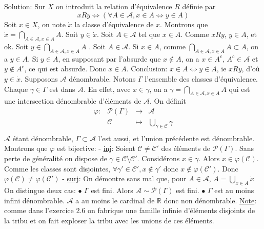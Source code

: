 \documentclass{report}
\begin{document}
Solution: Sur $X$ on introduit la relation d'équivalence $R$ définie par  $$xRy\iff \left(\forall A\in \mathcal A, x\in A \iff y\in A\right)$$ Soit $x\in X$, on note $\dot x$ la classe d'équivalence de $x$. Montrons que $\displaystyle \dot x = \bigcap_{A\in \mathcal A, x\in A}A$.\newline
\fbox{$\subset$}  Soit $y\in \dot x$. Soit $A\in \mathcal A$ tel que $x\in A$. Comme $xRy$, $y\in A$, et ok.\newline
\fbox{$\supset$} Soit $y\in \bigcap_{A\in \mathcal A, x\in A}A$ . Soit $A\in \mathcal A$. Si $x\in A$, comme $\bigcap_{A\in \mathcal A, x\in A}A \subset A$, \newline on a $y\in A$. Si $y\in A$, en supposant par l'absurde que $x\notin A$, on a $x\in A^c$, $A^c \in \mathcal A$ et  $y\notin A^c$, ce qui est absurde. Donc $x\in A$. Conclusion: $x\in A \iff y\in A$, ie $xRy$, d'où $y\in \dot x$.\newline \newline
Supposons $\mathcal A$ dénombrable.\newline
Notons $\Gamma$ l'ensemble des classes d'équivalence. Chaque $\gamma \in \Gamma$ est dans $\mathcal A$. En effet, avec $x\in \gamma$, on a $\gamma = \bigcap_{A\in \mathcal A, x\in A} A$ qui est une intersection dénombrable d'éléments de $\mathcal A$.\newline
On définit
$$\begin{array}{clcl}
  \varphi : &\mathcal{P}(\Gamma) &\longrightarrow  &\mathcal A\\
      &\mathcal C        &\longmapsto      & \bigcup_{\gamma \in \mathcal C} \gamma \\
\end{array}$$
$\mathcal A$ étant dénombrable, $\Gamma\subset \mathcal A$ l'est aussi, et l'union précédente est dénombrable.
Montrons que $\varphi$ est bijective: \newline
- \underline {inj}: Soient $\mathcal C \neq \mathcal C'$ des éléments de $\mathcal P(\Gamma)$. Sans perte de généralité on dispose de $\gamma \in \mathcal C \setminus \mathcal C'$. Considérons $x\in \gamma$. Alors $x\in \varphi(\mathcal C)$. Comme les classes sont disjointes, $\forall \gamma' \in \mathcal C', x\notin \gamma'$ donc $x\notin \varphi(\mathcal C')$. Donc $\varphi(\mathcal C) \neq \varphi(\mathcal C')$ \newline
- \underline {surj}: On démontre sans mal que, pour $A\in \mathcal A$, $\displaystyle A=\bigcup_{x\in A} \dot x$ \newline
On distingue deux cas: \newline
$\bullet$ $\Gamma$ est fini. Alors $\mathcal A\sim \mathcal{P}(\Gamma)$ est fini.\newline
$\bullet$ $\Gamma$ est au moins infini dénombrable. $\mathcal A$ a au moins le cardinal de $\mathbb R$ donc non dénombrable. \newline
\underline{Note}: comme dans l'exercice 2.6 on fabrique une famille infinie d'éléments disjoints de la tribu et on fait exploser la tribu avec les unions de ces éléments.
\end{document}
